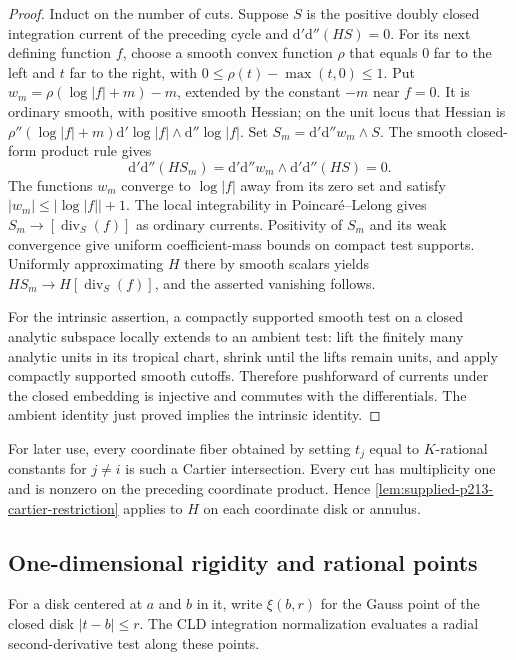 \begin{proof}
Induct on the number of cuts. Suppose $S$ is the positive doubly closed integration current of the preceding cycle and $\mathrm d'\mathrm d''(HS)=0$. For its next defining function $f$, choose a smooth convex function $\rho$ that equals $0$ far to the left and $t$ far to the right, with $0\leq\rho(t)-\max(t,0)\leq1$. Put $w_m=\rho(\log|f|+m)-m$, extended by the constant $-m$ near $f=0$. It is ordinary smooth, with positive smooth Hessian; on the unit locus that Hessian is $\rho''(\log|f|+m)\mathrm d'\log|f|\wedge\mathrm d''\log|f|$. Set $S_m=\mathrm d'\mathrm d''w_m\wedge S$. The smooth closed-form product rule gives
\[
 \mathrm d'\mathrm d''(HS_m)=\mathrm d'\mathrm d''w_m\wedge\mathrm d'\mathrm d''(HS)=0.
\]
The functions $w_m$ converge to $\log|f|$ away from its zero set and satisfy $|w_m|\leq|\log|f||+1$. The local integrability in Poincar\'e--Lelong gives $S_m\to[\operatorname{div}_S(f)]$ as ordinary currents. Positivity of $S_m$ and its weak convergence give uniform coefficient-mass bounds on compact test supports. Uniformly approximating $H$ there by smooth scalars yields $HS_m\to H[\operatorname{div}_S(f)]$, and the asserted vanishing follows.

For the intrinsic assertion, a compactly supported smooth test on a closed analytic subspace locally extends to an ambient test: lift the finitely many analytic units in its tropical chart, shrink until the lifts remain units, and apply compactly supported smooth cutoffs. Therefore pushforward of currents under the closed embedding is injective and commutes with the differentials. The ambient identity just proved implies the intrinsic identity.
\end{proof}

For later use, every coordinate fiber obtained by setting $t_j$ equal to $K$-rational constants for $j\neq i$ is such a Cartier intersection. Every cut has multiplicity one and is nonzero on the preceding coordinate product. Hence \cref{lem:supplied-p213-cartier-restriction} applies to $H$ on each coordinate disk or annulus.

\subsection{One-dimensional rigidity and rational points}\label{sec:supplied-p213-curves}

For a disk centered at $a$ and $b$ in it, write $\xi(b,r)$ for the Gauss point of the closed disk $|t-b|\leq r$. The CLD integration normalization evaluates a radial second-derivative test along these points.

